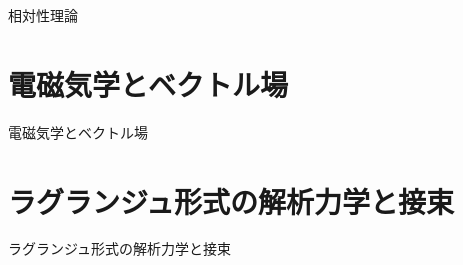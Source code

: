 相対性理論

\newpage


\section{ 電磁気学とベクトル場 }

電磁気学とベクトル場

\newpage


\section{ ラグランジュ形式の解析力学と接束 }

ラグランジュ形式の解析力学と接束

\newpage

